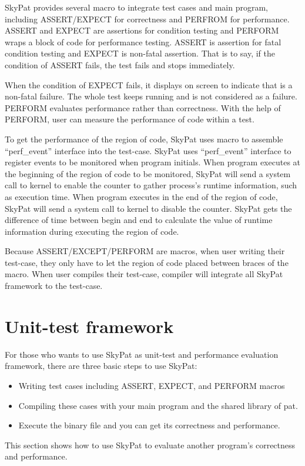 \documentclass[final]{ols}
\begin{document}
SkyPat provides several macro to integrate test cases and main program, including ASSERT/EXPECT for correctness and PERFROM for performance.
ASSERT and EXPECT are assertions for condition testing and PERFORM wraps a block of code for performance testing.
ASSERT is assertion for fatal condition testing and EXPECT is non-fatal assertion.
That is to say, if the condition of ASSERT fails, the test fails and stops immediately.

When the condition of EXPECT fails, it displays on screen to indicate that is a non-fatal failure.
The whole test keeps running and is not considered as a failure.
PERFORM evaluates performance rather than correctness.
With the help of PERFORM, user can measure the performance of code within a test.

To get the performance of the region of code, SkyPat uses macro to assemble ``perf\_event'' interface into the test-case.
SkyPat uses ``perf\_event'' interface to register events to be monitored when program initials.
When program executes at the beginning of the region of code to be monitored, SkyPat will send a system call to kernel to enable the counter to gather process's runtime information, such as execution time.
When program executes in the end of the region of code, SkyPat will send a system call to kernel to disable the counter.
SkyPat gets the difference of time between begin and end to calculate the value of runtime information during executing the region of code.

Because ASSERT/EXCEPT/PERFORM are macros, when user writing their test-case, they only have to let the region of code placed between braces of the macro.
When user compiles their test-case, compiler will integrate all SkyPat framework to the test-case.

\section{Unit-test framework}
For those who wants to use SkyPat as unit-test and performance evaluation framework, there are three basic steps to use SkyPat:
\begin{itemize}
\item Writing test cases including ASSERT, EXPECT, and PERFORM macros
\item Compiling these cases with your main program and the shared library of pat.
\item Execute the binary file and you can get its correctness and performance.
\end{itemize}
This section shows how to use SkyPat to evaluate another program's correctness and performance.
\end{document}
